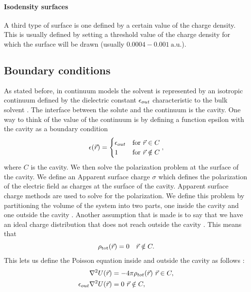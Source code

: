 \documentclass[../master_thesis.tex]{subfiles}
\begin{document}
\paragraph{Isodensity surfaces}
A third type of surface is one defined by a certain value of the charge density.
This is usually defined by setting a threshold value of the charge density for
which the surface will be drawn (usually $0.0004-0.001\ \text{a.u.}$)\cite{Tomasi:2005ipa}.


\subsection{Boundary conditions}
As stated before, in continuum models the solvent is represented by an isotropic
continuum defined by the dielectric constant $\epsilon_{out}$ characteristic to the bulk
solvent \cite{Tomasi:1994wt}. The interface between the solute and the continuum
is the cavity. One way to think of the value of the continuum is by defining a
function epsilon with the cavity as a boundary condition \cite{Tomasi:2005ipa, Tomasi:1994wt}
\begin{equation}
  \epsilon(\vec{r}) =
  \begin{cases}
  \epsilon_{out} & \text{for} \ \vec{r}\in C\\
  1 & \text{for}\ \vec{r} \notin C
\end{cases},
\end{equation}
where $C$ is the cavity. We then solve the polarization problem at the surface
of the cavity. We define an Apparent surface charge $\sigma$ which defines the
polarization of the electric field as charges at the surface of the cavity. Apparent surface
charge methods are used to solve for the polarization.
 We define this problem by partitioning the volume of the system
into two parts, one inside the cavity and one outside the cavity \cite{Tomasi:1994wt}.
Another assumption that is made is to say that we have an ideal charge distribution
that does not reach outside the cavity \cite{Cramer:2004, Tomasi:1994wt}.
This means that \cite{Tomasi:1994wt}
\begin{equation}
  \rho_{\mathrm{tot}}(\vec{r})=0 \quad \vec{r} \notin C.
\end{equation}
This lets us define the Poisson equation inside and outside the cavity as follows
\cite{Sorland, Tomasi:1994wt}:
\begin{align}
  \begin{split}
    \nabla^2U(\vec{r}) &= -4\pi\rho_{tot}(\vec{r})\ \vec{r}\in C,\\
    \epsilon_{out}\nabla^2U(\vec{r}) &= 0 \ \vec{r} \notin C,
  \end{split}
\end{align}
\end{document}

